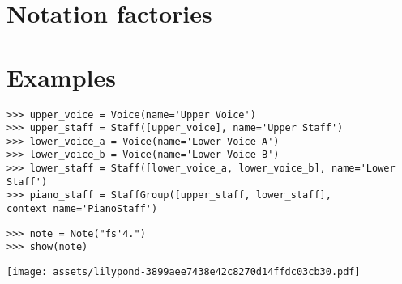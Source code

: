\section{Notation factories}

\begin{comment}
-   rhythm-makers
-   score templates
-   parsers
    -   LilyPond parser
    -   PLY
    -   SchemeParser
    -   RhythmTreeParser
    -   ReducedLyParser
\end{comment}

\section{Examples}

\begin{comment}
<abjad>
upper_voice = Voice(name='Upper Voice')
upper_staff = Staff([upper_voice], name='Upper Staff')
lower_voice_a = Voice(name='Lower Voice A')
lower_voice_b = Voice(name='Lower Voice B')
lower_staff = Staff([lower_voice_a, lower_voice_b], name='Lower Staff')
piano_staff = StaffGroup([upper_staff, lower_staff], context_name='PianoStaff')
</abjad>
\end{comment}

\begin{abjadbookoutput}
\begin{singlespacing}
\vspace{-0.5\baselineskip}
\begin{lstlisting}
>>> upper_voice = Voice(name='Upper Voice')
>>> upper_staff = Staff([upper_voice], name='Upper Staff')
>>> lower_voice_a = Voice(name='Lower Voice A')
>>> lower_voice_b = Voice(name='Lower Voice B')
>>> lower_staff = Staff([lower_voice_a, lower_voice_b], name='Lower Staff')
>>> piano_staff = StaffGroup([upper_staff, lower_staff], context_name='PianoStaff')
\end{lstlisting}
\end{singlespacing}
\end{abjadbookoutput}

\begin{comment}
<abjad>
note = Note("fs'4.")
show(note)
</abjad>
\end{comment}

\begin{abjadbookoutput}
\begin{singlespacing}
\vspace{-0.5\baselineskip}
\begin{lstlisting}
>>> note = Note("fs'4.")
>>> show(note)
\end{lstlisting}
\noindent\texttt{[image: assets/lilypond-3899aee7438e42c8270d14ffdc03cb30.pdf]}
\end{singlespacing}
\end{abjadbookoutput}

